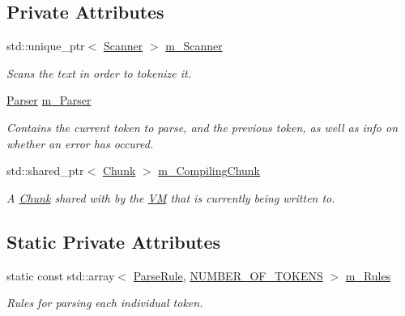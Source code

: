 \subsection*{Private Attributes}
\begin{DoxyCompactItemize}
\item 
\mbox{\label{class_compiler_a4c25300ca7cd409066eee9a3545e1cf6}} 
std\+::unique\+\_\+ptr$<$ \hyperlink{class_scanner}{Scanner} $>$ \hyperlink{class_compiler_a4c25300ca7cd409066eee9a3545e1cf6}{m\+\_\+\+Scanner}
\begin{DoxyCompactList}\small\item\em Scans the text in order to tokenize it. \end{DoxyCompactList}\item 
\mbox{\label{class_compiler_a09a4333f650c63d7a10daa7ebed2cbec}} 
\hyperlink{struct_compiler_1_1_parser}{Parser} \hyperlink{class_compiler_a09a4333f650c63d7a10daa7ebed2cbec}{m\+\_\+\+Parser}
\begin{DoxyCompactList}\small\item\em Contains the current token to parse, and the previous token, as well as info on whether an error has occured. \end{DoxyCompactList}\item 
\mbox{\label{class_compiler_a1f46be8a320414d97aa6c132ce0cbbfa}} 
std\+::shared\+\_\+ptr$<$ \hyperlink{class_chunk}{Chunk} $>$ \hyperlink{class_compiler_a1f46be8a320414d97aa6c132ce0cbbfa}{m\+\_\+\+Compiling\+Chunk}
\begin{DoxyCompactList}\small\item\em A \hyperlink{class_chunk}{Chunk} shared with by the \hyperlink{class_v_m}{VM} that is currently being written to. \end{DoxyCompactList}\end{DoxyCompactItemize}
\subsection*{Static Private Attributes}
\begin{DoxyCompactItemize}
\item 
\mbox{\label{class_compiler_a9d1dac8331943f6c89854141ee7ec9bf}} 
static const std\+::array$<$ \hyperlink{struct_compiler_1_1_parse_rule}{Parse\+Rule}, \hyperlink{_scanner_8h_ac5fae9d7fbb790a2d8115e165617ebcb}{N\+U\+M\+B\+E\+R\+\_\+\+O\+F\+\_\+\+T\+O\+K\+E\+NS} $>$ \hyperlink{class_compiler_a9d1dac8331943f6c89854141ee7ec9bf}{m\+\_\+\+Rules}
\begin{DoxyCompactList}\small\item\em Rules for parsing each individual token. \end{DoxyCompactList}\end{DoxyCompactItemize}


